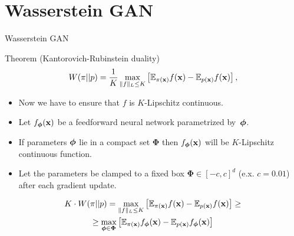 \section{Wasserstein GAN}
\begin{frame}{Wasserstein GAN}
	\begin{block}{Theorem (Kantorovich-Rubinstein duality)}
		\[
		W(\pi || p) = \frac{1}{K} \max_{\| f \|_L \leq K} \left[ \mathbb{E}_{\pi(\mathbf{x})} f(\mathbf{x})  - \mathbb{E}_{p(\mathbf{x})} f(\mathbf{x})\right],
		\]
	\end{block}
	\begin{itemize}
		\item Now we have to ensure that $f$ is $K$-Lipschitz continuous.
		\item Let $f_{\boldsymbol{\phi}}(\mathbf{x})$ be a feedforward neural network parametrized by~$\boldsymbol{\phi}$.
		\item If parameters $\boldsymbol{\phi}$ lie in a compact set $\boldsymbol{\Phi}$ then $f_{\boldsymbol{\phi}}(\mathbf{x})$ will be $K$-Lipschitz continuous function. 
		\item Let the parameters be clamped to a fixed box $\boldsymbol{\Phi} \in [-c, c]^d$ (e.x. $c = 0.01$) after each gradient update.
	\end{itemize}
	\begin{multline*}
		K \cdot W(\pi || p) = \max_{\| f \|_L \leq K} \left[ \mathbb{E}_{\pi(\mathbf{x})} f(\mathbf{x})  - \mathbb{E}_{p(\mathbf{x})} f(\mathbf{x})\right] \geq \\  \geq \max_{\boldsymbol{\phi} \in \boldsymbol{\Phi}} \left[ \mathbb{E}_{\pi(\mathbf{x})} f_{\boldsymbol{\phi}}(\mathbf{x})  - \mathbb{E}_{p(\mathbf{x})} f_{\boldsymbol{\phi}}(\mathbf{x})\right]
	\end{multline*}
	
\end{frame}

